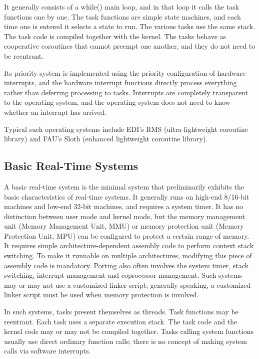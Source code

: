 It generally consists of a while() main loop, and in that loop it calls the task functions one by one. The task functions are simple state machines, and each time one is entered it selects a state to run. The various tasks use the same stack. The task code is compiled together with the kernel. The tasks behave as cooperative coroutines that cannot preempt one another, and they do not need to be reentrant.

Its priority system is implemented using the priority configuration of hardware interrupts, and the hardware interrupt functions directly process everything rather than deferring processing to tasks. Interrupts are completely transparent to the operating system, and the operating system does not need to know whether an interrupt has arrived.

Typical such operating systems include EDI's RMS (ultra-lightweight coroutine library) and FAU's Sloth (enhanced lightweight coroutine library).

\subsection{Basic Real-Time Systems}\label{subsec:1-basic-real-time-systems}

A basic real-time system is the minimal system that preliminarily exhibits the basic characteristics of real-time systems. It generally runs on high-end 8/16-bit machines and low-end 32-bit machines, and requires a system timer. It has no distinction between user mode and kernel mode, but the memory management unit (Memory Management Unit, MMU) or memory protection unit (Memory Protection Unit, MPU) can be configured to protect a certain range of memory. It requires simple architecture-dependent assembly code to perform context stack switching. To make it runnable on multiple architectures, modifying this piece of assembly code is mandatory. Porting also often involves the system timer, stack switching, interrupt management and coprocessor management. Such systems may or may not use a customized linker script; generally speaking, a customized linker script must be used when memory protection is involved.

In such systems, tasks present themselves as threads. Task functions may be reentrant. Each task uses a separate execution stack. The task code and the kernel code may or may not be compiled together. Tasks calling system functions usually use direct ordinary function calls; there is no concept of making system calls via software interrupts.

